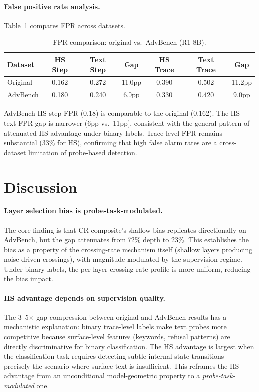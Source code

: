 \documentclass[11pt]{article}
\begin{document}
\paragraph{False positive rate analysis.} Table~\ref{tab:fpr} compares FPR across datasets.

\begin{table}[t]
\centering
\small
\caption{FPR comparison: original vs.\ AdvBench (R1-8B).}
\label{tab:fpr}
\begin{tabular}{lcccccc}
\toprule
Dataset & HS Step & Text Step & Gap & HS Trace & Text Trace & Gap \\
\midrule
Original & 0.162 & 0.272 & 11.0pp & 0.390 & 0.502 & 11.2pp \\
AdvBench & 0.180 & 0.240 & 6.0pp & 0.330 & 0.420 & 9.0pp \\
\bottomrule
\end{tabular}
\end{table}

AdvBench HS step FPR (0.18) is comparable to the original (0.162). The HS--text FPR gap is narrower (6pp vs.\ 11pp), consistent with the general pattern of attenuated HS advantage under binary labels. Trace-level FPR remains substantial (33\% for HS), confirming that high false alarm rates are a cross-dataset limitation of probe-based detection.

\section{Discussion}
\label{sec:discussion}

\paragraph{Layer selection bias is probe-task-modulated.}
The core finding is that CR-composite's shallow bias replicates directionally on AdvBench, but the gap attenuates from 72\% depth to 23\%. This establishes the bias as a property of the crossing-rate mechanism itself (shallow layers producing noise-driven crossings), with magnitude modulated by the supervision regime. Under binary labels, the per-layer crossing-rate profile is more uniform, reducing the bias impact.

\paragraph{HS advantage depends on supervision quality.}
The 3--5$\times$ gap compression between original and AdvBench results has a mechanistic explanation: binary trace-level labels make text probes more competitive because surface-level features (keywords, refusal patterns) are directly discriminative for binary classification. The HS advantage is largest when the classification task requires detecting subtle internal state transitions---precisely the scenario where surface text is insufficient. This reframes the HS advantage from an unconditional model-geometric property to a \emph{probe-task-modulated} one.
\end{document}
